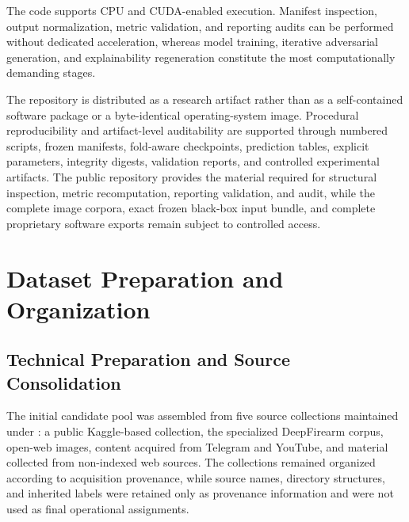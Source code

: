 The code supports CPU and CUDA-enabled execution. Manifest inspection, output
normalization, metric validation, and reporting audits can be performed without
dedicated acceleration, whereas model training, iterative adversarial
generation, and explainability regeneration constitute the most computationally
demanding stages.

The repository is distributed as a research artifact rather than as a
self-contained software package or a byte-identical operating-system image.
Procedural reproducibility and artifact-level auditability are supported
through numbered scripts, frozen manifests, fold-aware checkpoints, prediction
tables, explicit parameters, integrity digests, validation reports, and
controlled experimental artifacts. The public repository provides the material
required for structural inspection, metric recomputation, reporting validation,
and audit, while the complete image corpora, exact frozen black-box input
bundle, and complete proprietary software exports remain subject to controlled
access.











\section{Dataset Preparation and Organization}
\label{sec:implementation-dataset}
\subsection{Technical Preparation and Source Consolidation}
\label{subsec:implementation-dataset-preparation}

The initial candidate pool was assembled from five source collections maintained
under : a public Kaggle-based collection, the
specialized DeepFirearm corpus, open-web images, content acquired from Telegram
and YouTube, and material collected from non-indexed web sources. The
collections remained organized according to acquisition provenance, while
source names, directory structures, and inherited labels were retained only as
provenance information and were not used as final operational assignments.

